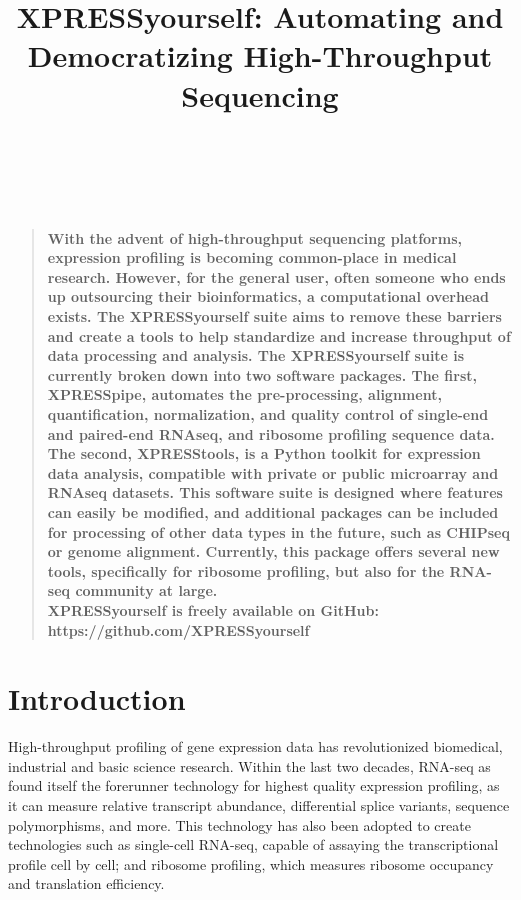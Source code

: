 \documentclass[11pt, a4paper, oneside]{article}
\title{
XPRESSyourself: Automating and Democratizing High-Throughput Sequencing
}
\author
{
\\
\\
}
\date{}
\newenvironment{sciabstract}{%
\begin{quote} \bf}
{\end{quote}}
\begin{document}
\baselineskip24pt

\maketitle




\begin{sciabstract}
  With the advent of high-throughput sequencing platforms, expression profiling is becoming common-place in medical research. However, for the general user, often someone who ends up outsourcing their bioinformatics, a computational overhead exists. The XPRESSyourself suite aims to remove these barriers and create a tools to help standardize and increase throughput of data processing and analysis. The XPRESSyourself suite is currently broken down into two software packages. The first, XPRESSpipe, automates the pre-processing, alignment, quantification, normalization, and quality control of single-end and paired-end RNAseq, and ribosome profiling sequence data. The second, XPRESStools, is a Python toolkit for expression data analysis, compatible with private or public microarray and RNAseq datasets. This software suite is designed where features can easily be modified, and additional packages can be included for processing of other data types in the future, such as CHIPseq or genome alignment. Currently, this package offers several new tools, specifically for ribosome profiling, but also for the RNA-seq community at large.
  \newline\\
  \normalfont XPRESSyourself is freely available on GitHub: https://github.com/XPRESSyourself\\
\end{sciabstract}


\section{Introduction}

High-throughput profiling of gene expression data has revolutionized biomedical, industrial and basic science research. Within the last two decades, RNA-seq as found itself the forerunner technology for highest quality expression profiling, as it can measure relative transcript abundance, differential splice variants, sequence polymorphisms, and more. This technology has also been adopted to create technologies such as single-cell RNA-seq, capable of assaying the transcriptional profile cell by cell; and ribosome profiling, which measures ribosome occupancy and translation efficiency.
\end{document}
